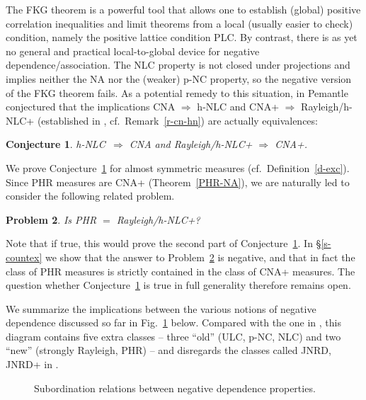 \documentclass[10pt,reqno]{amsart}
\theoremstyle{plain}
\newtheorem{problem}{Problem}[section]
\newtheorem{conjecture}[problem]{Conjecture}
\theoremstyle{definition}
\theoremstyle{remark}
\begin{document}
The FKG theorem \cite{FKG} is a powerful tool that allows one to establish 
(global) positive correlation inequalities and limit theorems from a 
local (usually easier to check) condition, namely the positive lattice 
condition PLC. By contrast, there is as yet no general and practical 
local-to-global device for negative dependence/association. 
The NLC property is not closed under 
projections and implies neither the NA nor the (weaker) p-NC property, so the
negative version of the FKG theorem fails. As a potential remedy to this
situation, in \cite[Conjecture~2]{P} Pemantle
conjectured that the implications 
CNA $\Rightarrow$ h-NLC and CNA+ $\Rightarrow$ Rayleigh/h-NLC+ 
(established in \cite{P}, cf.~Remark~\ref{r-cn-hn}) are actually equivalences:

\begin{conjecture}\label{con-cna-R}
h-NLC $\,\Rightarrow$ CNA and Rayleigh/h-NLC+ $\Rightarrow$ CNA+. 
\end{conjecture}

We prove Conjecture~\ref{con-cna-R} 
for almost symmetric measures (cf.~Definition~\ref{d-exc}). 
Since PHR measures are CNA+  
(Theorem~\ref{PHR-NA}), we are naturally
led to consider the following related problem. 

\begin{problem}\label{prob-phr-cna}
Is PHR $=$ Rayleigh/h-NLC+?
\end{problem}

Note that if true, this would prove the second part of 
Conjecture~\ref{con-cna-R}. 
In \S \ref{s-countex} we show that the answer to 
Problem~\ref{prob-phr-cna} is negative, and that in fact the class of 
PHR measures 
is strictly contained in the class of CNA+ measures. The question 
whether Conjecture~\ref{con-cna-R} is true in full generality 
therefore remains open.

We summarize the implications between the various notions of 
negative dependence discussed so far in Fig.~\ref{fig} below. 
Compared with
the one in \cite[\S II.B]{P}, this diagram contains five extra 
classes -- three ``old'' (ULC, p-NC, NLC) and two ``new'' 
(strongly Rayleigh, PHR) -- and disregards the classes called 
JNRD, JNRD+ in \cite{P}.

\begin{figure}[!htb]
\caption{Subordination relations between negative dependence properties.}
\label{fig}
\end{figure}
\end{document}
